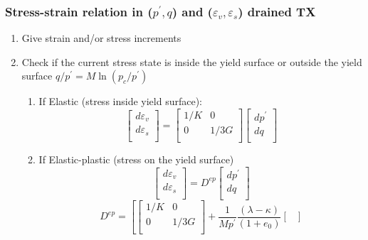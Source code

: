 \documentclass[notes]{beamer}
\begin{document}
\begin{frame}
\frametitle{Stress-strain relation in ($p^\prime, q$) and ($\varepsilon_v, \varepsilon_s$) drained TX}
\begin{enumerate}
	\item Give strain and/or stress increments
	\item Check if the current stress state is inside the yield surface or outside the yield surface $q/p^\prime = M \ln (p_c/p^\prime)$
	\begin{enumerate}
		\item If Elastic (stress inside yield surface):
		\begin{equation*}
		\begin{bmatrix}
		d\varepsilon_v \\
		d\varepsilon_s \\
		\end{bmatrix} = %
		\begin{bmatrix}
		1/K & 0 \\
		0 & 1/3G\\
		\end{bmatrix} %
		\begin{bmatrix}
		dp^\prime \\
		dq\\
		\end{bmatrix}
		\end{equation*}
		\item If Elastic-plastic (stress on the yield surface)
		\begin{equation*}
		\begin{bmatrix}
		d\varepsilon_v \\
		d\varepsilon_s \\
		\end{bmatrix} = %
		D^{ep}
		\begin{bmatrix}
		dp^\prime \\
		dq\\
		\end{bmatrix}
		\end{equation*}		
		\begin{equation*}
		D^{ep} =\left[
		\begin{bmatrix}
		1/K & 0 \\
		0 & 1/3G\\
		\end{bmatrix} + %
		\frac{1}{Mp^\prime}%
		\frac{(\lambda - \kappa)}{(1+e_0)}%
		\begin{bmatrix}

\end{bmatrix}
\end{equation*}
\end{enumerate}
\end{enumerate}
\end{frame}
\end{document}
